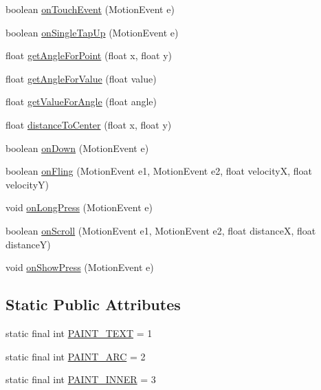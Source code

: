 \begin{DoxyCompactItemize}
\item 
boolean \hyperlink{classcs_1_1usense_1_1_circle_display_aaf6c2dfc0164cc62b51e5d5073b82492}{on\+Touch\+Event} (Motion\+Event e)
\item 
boolean \hyperlink{classcs_1_1usense_1_1_circle_display_ac827edffee1689c542df30cc3094e949}{on\+Single\+Tap\+Up} (Motion\+Event e)
\item 
float \hyperlink{classcs_1_1usense_1_1_circle_display_aa8d7cb3cf517fdaba8705e4fb84fd913}{get\+Angle\+For\+Point} (float x, float y)
\item 
float \hyperlink{classcs_1_1usense_1_1_circle_display_a1e58651f3ee25c4faf1dcb694d668f97}{get\+Angle\+For\+Value} (float value)
\item 
float \hyperlink{classcs_1_1usense_1_1_circle_display_aa60c295621d945b544491e9371be3788}{get\+Value\+For\+Angle} (float angle)
\item 
float \hyperlink{classcs_1_1usense_1_1_circle_display_ac6673ac7ec726f101a71122721a02268}{distance\+To\+Center} (float x, float y)
\item 
boolean \hyperlink{classcs_1_1usense_1_1_circle_display_a812cfdaa4973cd4e005d9424d3dc7ea3}{on\+Down} (Motion\+Event e)
\item 
boolean \hyperlink{classcs_1_1usense_1_1_circle_display_a80107f665f217e009d43d0e6556f2d37}{on\+Fling} (Motion\+Event e1, Motion\+Event e2, float velocity\+X, float velocity\+Y)
\item 
void \hyperlink{classcs_1_1usense_1_1_circle_display_aa04f3c2b0dc330a823e1c1e41f4db5b0}{on\+Long\+Press} (Motion\+Event e)
\item 
boolean \hyperlink{classcs_1_1usense_1_1_circle_display_a7a7bc0be877af30caa0c809e26556094}{on\+Scroll} (Motion\+Event e1, Motion\+Event e2, float distance\+X, float distance\+Y)
\item 
void \hyperlink{classcs_1_1usense_1_1_circle_display_a3b76d2601a394b96afcf831388b2d333}{on\+Show\+Press} (Motion\+Event e)
\end{DoxyCompactItemize}
\subsection*{Static Public Attributes}
\begin{DoxyCompactItemize}
\item 
static final int \hyperlink{classcs_1_1usense_1_1_circle_display_a697352d619ac6f54ae4c2811e61a0c61}{P\+A\+I\+N\+T\+\_\+\+T\+E\+X\+T} = 1
\item 
static final int \hyperlink{classcs_1_1usense_1_1_circle_display_ae1b0c1a2c3410fae27918a7149cbaeea}{P\+A\+I\+N\+T\+\_\+\+A\+R\+C} = 2
\item 
static final int \hyperlink{classcs_1_1usense_1_1_circle_display_afe7dda2665396e0c6f1e43913b9cea99}{P\+A\+I\+N\+T\+\_\+\+I\+N\+N\+E\+R} = 3
\end{DoxyCompactItemize}
